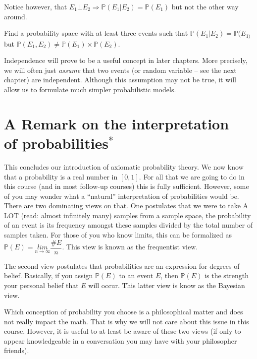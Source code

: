 \documentclass[a4paper,11pt,leqno]{report}
\begin{document}
Notice however, that
$ E_{1} \bot E_{2} \Rightarrow \mathbb{P}(E_{1}|E_{2}) = \mathbb{P}(E_{1}) $ but not the other way around.

\begin{Exercise}
Find a probability space with at least three events such that $ \mathbb{P}(E_{1}|E_{2}) = \mathbb{P}(E_{1)} $
but $ \mathbb{P}(E_{1}, E_{2}) \not = \mathbb{P}(E_{1}) \times \mathbb{P}(E_{2}) $.
\end{Exercise}

Independence will prove to be a useful concept in later chapters. More precisely, we will often
just \textit{assume} that two events (or random variable -- see the next chapter) are independent. Although
this assumption may not be true, it will allow us to formulate much simpler probabilistic models.


\section{A Remark on the interpretation \\ of probabilities$^{*}$}

This concludes our introduction of axiomatic probability theory. We now know that a probability is
a real number in $ [0,1] $. For all that we are going to do in this course (and in most follow-up courses)
this is fully sufficient. However, some of you may wonder what a ``natural'' interpretation of probabilities
would be. There are two dominating views on that. One postulates that we were to take A LOT (read: almost
infinitely many) samples from a sample space, the probability of an event is its frequency amongst these
samples divided by the total number of samples taken. For those of you who know limits, this can be
formalized as $ \mathbb{P}(E) = \underset{n \rightarrow \infty}{lim} \dfrac{\#E}{n} $. This view
is known as the frequentist view.

The second view postulates that probabilities are an expression for degrees of belief. Basically, 
if you assign $ \mathbb{P}(E) $ to an event $ E $, then $ \mathbb{P}(E) $ is the strength your personal belief that
$ E $ will occur. This latter view is know as the Bayesian view.

Which conception of probability you choose is a philosophical matter and does not really impact the math.
That is why we will not care about this issue in this course. However, it is useful to at least be aware
of these two views (if only to appear knowledgeable in a conversation you may have with your philosopher 
friends).
\end{document}

